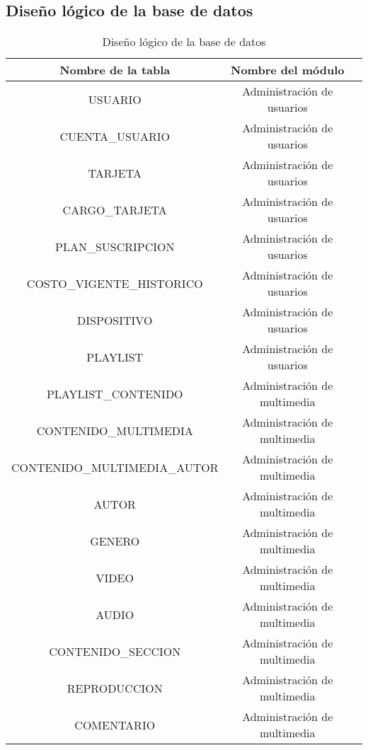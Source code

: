 \documentclass[journal]{IEEEtran}
\begin{document}
\subsection{Diseño lógico de la base de datos}
\begin{table}[H]
  \centering
  \begin{longtable}{|c | c | c|} 
   \hline
   Nombre de la tabla & Nombre del módulo \\ [0.5ex] 
   \hline
   USUARIO & Administración de usuarios \\ 
   \hline
   CUENTA\_USUARIO & Administración de usuarios \\ 
   \hline
   TARJETA & Administración de usuarios \\ 
   \hline
   CARGO\_TARJETA & Administración de usuarios \\ 
   \hline
   PLAN\_SUSCRIPCION & Administración de usuarios \\ 
   \hline
   COSTO\_VIGENTE\_HISTORICO & Administración de usuarios \\ 
   \hline
   DISPOSITIVO & Administración de usuarios \\ 
   \hline
   PLAYLIST & Administración de usuarios \\ 
   \hline
   PLAYLIST\_CONTENIDO & Administración de multimedia \\ 
   \hline
   CONTENIDO\_MULTIMEDIA & Administración de multimedia \\ 
   \hline
   CONTENIDO\_MULTIMEDIA\_AUTOR & Administración de multimedia \\ 
   \hline
   AUTOR & Administración de multimedia \\ 
   \hline
   GENERO & Administración de multimedia \\ 
   \hline
   VIDEO & Administración de multimedia \\ 
   \hline
   AUDIO & Administración de multimedia \\ 
   \hline
   CONTENIDO\_SECCION & Administración de multimedia \\ 
   \hline
   REPRODUCCION & Administración de multimedia \\ 
   \hline
   COMENTARIO & Administración de multimedia \\ 
   [1ex] 
   \hline
  \end{longtable}
  \caption{Diseño lógico de la base de datos}
  \label{tabla:4}
\end{table}
\end{document}
